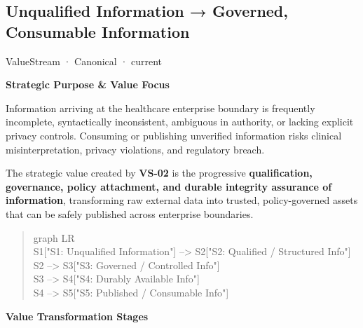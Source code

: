 \subsection{Unqualified Information → Governed, Consumable Information}

\label{element:02e036f18bab400bac261007e39457ee}
{\small ValueStream · Canonical · current}\par

\par\medskip\textbf{Strategic Purpose \& Value Focus}\par


Information arriving at the healthcare enterprise boundary is frequently incomplete, syntactically inconsistent, ambiguous in authority, or lacking explicit privacy controls. Consuming or publishing unverified information risks clinical misinterpretation, privacy violations, and regulatory breach.



The strategic value created by \textbf{VS-02} is the progressive \textbf{qualification, governance, policy attachment, and durable integrity assurance of information}, transforming raw external data into trusted, policy-governed assets that can be safely published across enterprise boundaries.



\begin{quote}\small\ttfamily
graph LR\\
    S1["S1: Unqualified Information"] --> S2["S2: Qualified / Structured Info"]\\
    S2 --> S3["S3: Governed / Controlled Info"]\\
    S3 --> S4["S4: Durably Available Info"]\\
    S4 --> S5["S5: Published / Consumable Info"]\\

\end{quote}


\par\medskip\textbf{Value Transformation Stages}\par


